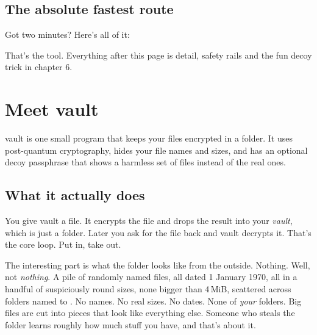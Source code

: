 \documentclass[10pt,oneside,openany]{book}
\begin{document}
\section*{The absolute fastest route}

Got two minutes? Here's all of it:


That's the tool. Everything after this page is detail, safety rails and the
fun decoy trick in chapter 6. 

{\hypersetup{linkcolor=vtext}\tableofcontents}

\mainmatter

\chapter{Meet vault}

\begin{tldr}
vault is one small program that keeps your files encrypted in a folder. It
uses post-quantum cryptography, hides your file names and sizes, and has an
optional decoy passphrase that shows a harmless set of files instead of the
real ones.
\end{tldr}

\section{What it actually does}

You give vault a file. It encrypts the file and drops the result into your
\emph{vault}, which is just a folder. Later you ask for the file back and vault
decrypts it. That's the core loop. Put in, take out.

The interesting part is what the folder looks like from the outside. Nothing.
Well, not \emph{nothing}. A pile of randomly named files, all dated 1 January
1970, all in a handful of suspiciously round sizes, none bigger than 4\,MiB,
scattered across folders named  to . No names. No real
sizes. No dates. None of \emph{your} folders. Big files are cut into pieces
that look like everything else. Someone who steals the folder learns roughly
how much stuff you have, and that's about it.
\end{document}
